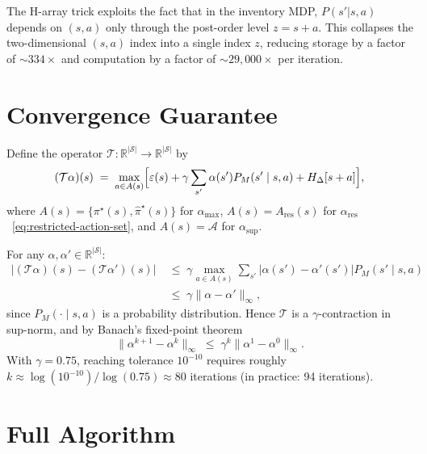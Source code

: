 \documentclass[11pt]{article}
\newcommand{\pistar}{\pi^\star}
\newcommand{\pihatstar}{\hat\pi^\star}
\newcommand{\alphares}{\alpha_{\mathrm{res}}}
\begin{document}
The H-array trick exploits the fact that in the inventory MDP, $P(s'|s,a)$
depends on $(s,a)$ only through the post-order level $z = s + a$.  This
collapses the two-dimensional $(s,a)$ index into a single index $z$, reducing
storage by a factor of $\sim\!334\times$ and computation by a factor of
$\sim\!29{,}000\times$ per iteration.

\section{Convergence Guarantee}

Define the operator $\mathcal{T}\colon \mathbb{R}^{|\mathcal{S}|} \to
\mathbb{R}^{|\mathcal{S}|}$ by
\[
  (\mathcal{T}\alpha)(s)
  \;=\; \max_{a \in A(s)}
        \Bigl[\varepsilon(s) + \gamma \sum_{s'} \alpha(s')  P_M(s' \mid s, a)
        + H_\Delta[s+a]\Bigr],
\]
where $A(s) = \{\pistar(s), \pihatstar(s)\}$ for $\alpha_{\max}$,
$A(s) = A_{\mathrm{res}}(s)$ for $\alphares$~\eqref{eq:restricted-action-set},
and $A(s) = \mathcal{A}$ for $\alpha_{\sup}$.

For any $\alpha, \alpha' \in \mathbb{R}^{|\mathcal{S}|}$:
\begin{align*}
  \bigl|(\mathcal{T}\alpha)(s) - (\mathcal{T}\alpha')(s)\bigr|
  &\;\le\; \gamma \max_{a \in A(s)} \sum_{s'} \bigl|\alpha(s') - \alpha'(s')\bigr|
             P_M(s' \mid s, a) \\
  &\;\le\; \gamma  \|\alpha - \alpha'\|_\infty,
\end{align*}
since $P_M(\cdot \mid s, a)$ is a probability distribution.  Hence $\mathcal{T}$
is a $\gamma$-contraction in sup-norm, and by Banach's fixed-point theorem
\[
  \|\alpha^{k+1} - \alpha^k\|_\infty
  \;\le\; \gamma^k   \|\alpha^1 - \alpha^0\|_\infty.
\]
With $\gamma = 0.75$, reaching tolerance $10^{-10}$ requires roughly
$k \approx \log(10^{-10}) / \log(0.75) \approx 80$ iterations (in practice:
94 iterations).

\section{Full Algorithm}
\end{document}
